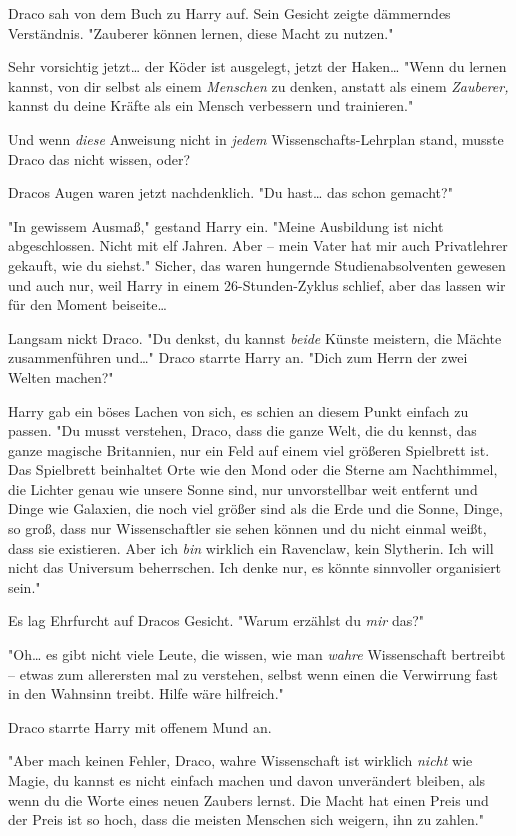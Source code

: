 {Draco sah von dem Buch zu Harry auf. Sein Gesicht zeigte dämmerndes Verständnis. "Zauberer können lernen, diese Macht zu nutzen."

Sehr vorsichtig jetzt… der Köder ist ausgelegt, jetzt der Haken… "Wenn du lernen kannst, von dir selbst als einem \emph{Menschen} zu denken, anstatt als einem \emph{Zauberer,} kannst du deine Kräfte als ein Mensch verbessern und trainieren."

Und wenn \emph{diese} Anweisung nicht in \emph{jedem} Wissenschafts-Lehrplan stand, musste Draco das nicht wissen, oder?

Dracos Augen waren jetzt nachdenklich. "Du hast… das schon gemacht?"

"In gewissem Ausmaß," gestand Harry ein. "Meine Ausbildung ist nicht abgeschlossen. Nicht mit elf Jahren. Aber -- mein Vater hat mir auch Privatlehrer gekauft, wie du siehst." Sicher, das waren hungernde Studienabsolventen gewesen und auch nur, weil Harry in einem 26-Stunden-Zyklus schlief, aber das lassen wir für den Moment beiseite…

Langsam nickt Draco. "Du denkst, du kannst \emph{beide} Künste meistern, die Mächte zusammenführen und…" Draco starrte Harry an. "Dich zum Herrn der zwei Welten machen?"

Harry gab ein böses Lachen von sich, es schien an diesem Punkt einfach zu passen. "Du musst verstehen, Draco, dass die ganze Welt, die du kennst, das ganze magische Britannien, nur ein Feld auf einem viel größeren Spielbrett ist. Das Spielbrett beinhaltet Orte wie den Mond oder die Sterne am Nachthimmel, die Lichter genau wie unsere Sonne sind, nur unvorstellbar weit entfernt und Dinge wie Galaxien, die noch viel größer sind als die Erde und die Sonne, Dinge, so groß, dass nur Wissenschaftler sie sehen können und du nicht einmal weißt, dass sie existieren. Aber ich \emph{bin} wirklich ein Ravenclaw, kein Slytherin. Ich will nicht das Universum beherrschen. Ich denke nur, es könnte sinnvoller organisiert sein."

Es lag Ehrfurcht auf Dracos Gesicht. "Warum erzählst du \emph{mir} das?"

"Oh… es gibt nicht viele Leute, die wissen, wie man \emph{wahre} Wissenschaft bertreibt -- etwas zum allerersten mal zu verstehen, selbst wenn einen die Verwirrung fast in den Wahnsinn treibt. Hilfe wäre hilfreich."

Draco starrte Harry mit offenem Mund an.

"Aber mach keinen Fehler, Draco, wahre Wissenschaft ist wirklich \emph{nicht} wie Magie, du kannst es nicht einfach machen und davon unverändert bleiben, als wenn du die Worte eines neuen Zaubers lernst. Die Macht hat einen Preis und der Preis ist so hoch, dass die meisten Menschen sich weigern, ihn zu zahlen."

}
